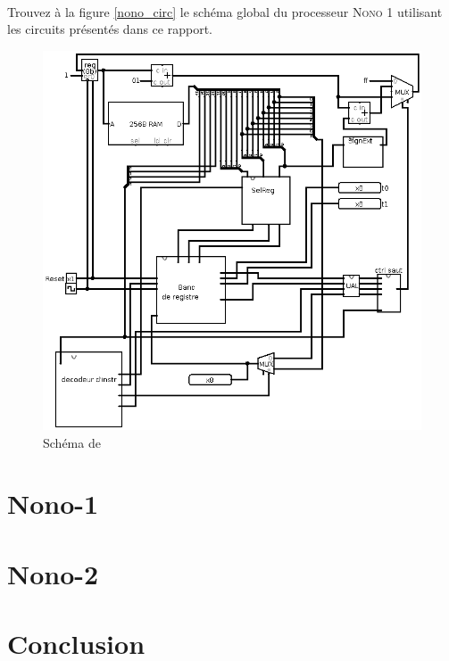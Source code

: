 \documentclass[a4paper]{article}
\begin{document}
		\paragraph{}{
				Trouvez à la figure \ref{nono_circ} le schéma global du processeur \textsc{Nono 1}
				utilisant les circuits présentés dans ce rapport.
		}
		
		\begin{figure}
			\centering
			\includegraphics[scale=0.35]{circuits/Nono-1.png}
			\caption{
			\label{non_circ}
			Schéma de 
			}
		\end{figure}
					
	
		\section{Nono-1}
			
		\section{Nono-2}
			
	

	
	
	\newpage
	\section*{Conclusion}
\end{document}
